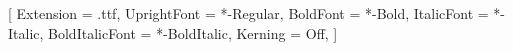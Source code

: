 \ifxetexorluatex
  \setmainfont{Lato}[
    Extension      = .ttf,
    UprightFont    = *-Regular,
    BoldFont       = *-Bold,
    ItalicFont     = *-Italic,
    BoldItalicFont = *-BoldItalic,
    Kerning        = Off,
  ]
\else
  \usepackage[utf8]{inputenc}
  \usepackage[T1]{fontenc}
  \usepackage[default]{lato}
\fi

\setlength{\RaggedRightRightskip}{0pt plus 6em}



